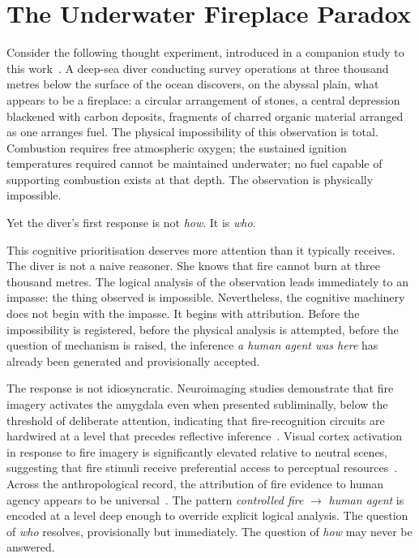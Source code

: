 \bigskip

\section{The Underwater Fireplace Paradox}

Consider the following thought experiment, introduced in a companion study to this work~\cite{author_fire_circle}. A deep-sea diver conducting survey operations at three thousand metres below the surface of the ocean discovers, on the abyssal plain, what appears to be a fireplace: a circular arrangement of stones, a central depression blackened with carbon deposits, fragments of charred organic material arranged as one arranges fuel. The physical impossibility of this observation is total. Combustion requires free atmospheric oxygen; the sustained ignition temperatures required cannot be maintained underwater; no fuel capable of supporting combustion exists at that depth. The observation is physically impossible.

Yet the diver's first response is not \textit{how}. It is \textit{who}.

This cognitive prioritisation deserves more attention than it typically receives. The diver is not a naive reasoner. She knows that fire cannot burn at three thousand metres. The logical analysis of the observation leads immediately to an impasse: the thing observed is impossible. Nevertheless, the cognitive machinery does not begin with the impasse. It begins with attribution. Before the impossibility is registered, before the physical analysis is attempted, before the question of mechanism is raised, the inference \textit{a human agent was here} has already been generated and provisionally accepted.

The response is not idiosyncratic. Neuroimaging studies demonstrate that fire imagery activates the amygdala even when presented subliminally, below the threshold of deliberate attention, indicating that fire-recognition circuits are hardwired at a level that precedes reflective inference~\cite{morris1998}. Visual cortex activation in response to fire imagery is significantly elevated relative to neutral scenes, suggesting that fire stimuli receive preferential access to perceptual resources~\cite{sabatinelli2005}. Across the anthropological record, the attribution of fire evidence to human agency appears to be universal~\cite{author_fire_circle}. The pattern \textit{controlled fire} $\rightarrow$ \textit{human agent} is encoded at a level deep enough to override explicit logical analysis. The question of \textit{who} resolves, provisionally but immediately. The question of \textit{how} may never be answered.

